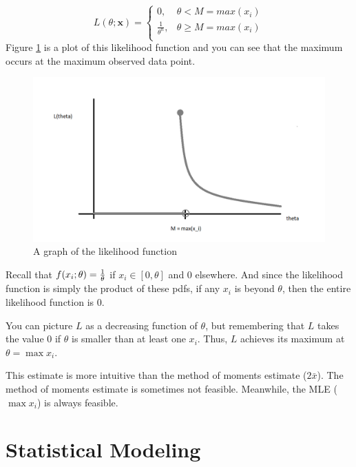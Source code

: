 \documentclass[
]{book}
\begin{document}
\[
L(\theta;\boldsymbol{x})=\left\{\begin{array}{ll} 0, & \theta < M= max(x_i) \\
\frac{1}{\theta^n}, & \theta \geq M = max(x_i) \\
\end{array}\right. 
\]
Figure \ref{fig:fig1} is a plot of this likelihood function and you can see that the maximum occurs at the maximum observed data point.

\begin{figure}

{\centering \includegraphics[width=16in]{figures/L_theta} 

}

\caption{A graph of the likelihood function}\label{fig:fig1}
\end{figure}

Recall that \(f(x_i;\theta)={1\over \theta}\) if \(x_i\in [0,\theta]\) and 0 elsewhere. And since the likelihood function is simply the product of these pdfs, if any \(x_i\) is beyond \(\theta\), then the entire likelihood function is 0.

You can picture \(L\) as a decreasing function of \(\theta\), but remembering that \(L\) takes the value 0 if \(\theta\) is smaller than at least one \(x_i\). Thus, \(L\) achieves its maximum at \(\theta=\max x_i\).

This estimate is more intuitive than the method of moments estimate (\(2\bar{x}\)). The method of moments estimate is sometimes not feasible. Meanwhile, the MLE (\(\max x_i\)) is always feasible.

\hypertarget{part-statistical-modeling}{%
\part{Statistical Modeling}\label{part-statistical-modeling}}
\end{document}
